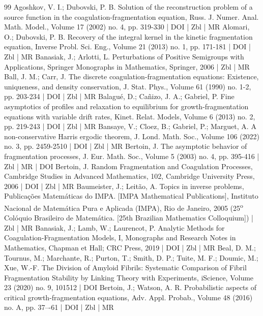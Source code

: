 \begin{thebibliography}{99}
Agoshkov, V. I.; Dubovski, P. B. Solution of the reconstruction problem of a source function in the coagulation-fragmentation equation, Russ. J. Numer. Anal. Math. Model., Volume 17 (2002) no. 4, pp. 319-330 | DOI | Zbl | MR
Alomari, O.; Dubovski, P. B. Recovery of the integral kernel in the kinetic fragmentation equation, Inverse Probl. Sci. Eng., Volume 21 (2013) no. 1, pp. 171-181 | DOI | Zbl | MR
Banasiak, J.; Arlotti, L. Perturbations of Positive Semigroups with Applications, Springer Monographs in Mathematics, Springer, 2006 | Zbl | MR
Ball, J. M.; Carr, J. The discrete coagulation-fragmentation equations: Existence, uniqueness, and density conservation, J. Stat. Phys., Volume 61 (1990) no. 1-2, pp. 203-234 | DOI | Zbl | MR
Balagué, D.; Cañizo, J. A.; Gabriel, P. Fine asymptotics of profiles and relaxation to equilibrium for growth-fragmentation equations with variable drift rates, Kinet. Relat. Models, Volume 6 (2013) no. 2, pp. 219-243 | DOI | Zbl | MR
Bansaye, V.; Cloez, B.; Gabriel, P.; Marguet, A. A non-conservative Harris ergodic theorem, J. Lond. Math. Soc., Volume 106 (2022) no. 3, pp. 2459-2510 | DOI | Zbl | MR
Bertoin, J. The asymptotic behavior of fragmentation processes, J. Eur. Math. Soc., Volume 5 (2003) no. 4, pp. 395-416 | Zbl | MR | DOI
Bertoin, J. Random Fragmentation and Coagulation Processes, Cambridge Studies in Advanced Mathematics, 102, Cambridge University Press, 2006 | DOI | Zbl | MR
Baumeister, J.; Leitão, A. Topics in inverse problems, Publicações Matemáticas do IMPA. [IMPA Mathematical Publications], Instituto Nacional de Matemática Pura e Aplicada (IMPA), Rio de Janeiro, 2005 (25\textsuperscript{o} Colóquio Brasileiro de Matemática. [25th Brazilian Mathematics Colloquium]) | Zbl | MR
Banasiak, J.; Lamb, W.; Laurencot, P. Analytic Methods for Coagulation-Fragmentation Models, I, Monographs and Research Notes in Mathematics, Chapman et Hall; CRC Press, 2019 | DOI | Zbl | MR
Beal, D. M.; Tournus, M.; Marchante, R.; Purton, T.; Smith, D. P.; Tuite, M. F.; Doumic, M.; Xue, W.-F. The Division of Amyloid Fibrils: Systematic Comparison of Fibril Fragmentation Stability by Linking Theory with Experiments, iScience, Volume 23 (2020) no. 9, 101512 | DOI
Bertoin, J.; Watson, A. R. Probabilistic aspects of critical growth-fragmentation equations, Adv. Appl. Probab., Volume 48 (2016) no. A, pp. 37–-61 | DOI | Zbl | MR

\end{thebibliography}
